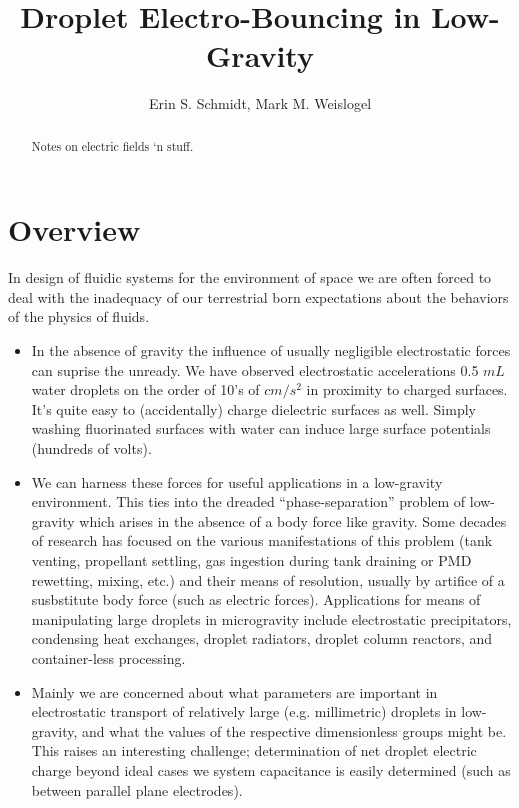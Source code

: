 \documentclass[a4paper, 12pt]{article}
\title{\textsf{\textbf{Droplet Electro-Bouncing in Low-Gravity}}}
\author{Erin S. Schmidt, Mark M. Weislogel}
\date{}
\begin{document}
\maketitle

\begin{abstract}
\noindent
Notes on electric fields `n stuff.
\end{abstract}

\section{Overview}
In design of fluidic systems for the environment of space we are often forced to deal with the inadequacy of our terrestrial born expectations about the behaviors of the physics of fluids.   

\begin{itemize}
\item In the absence of gravity the influence of usually negligible electrostatic forces can suprise the unready. We have observed electrostatic accelerations 0.5 $mL$ water droplets on the order of 10's of $cm/s^2$ in proximity to charged surfaces. It's quite easy to (accidentally) charge dielectric surfaces as well. Simply washing fluorinated surfaces with water can induce large surface potentials (hundreds of volts).

\item We can harness these forces for useful applications in a low-gravity environment. This ties into the dreaded ``phase-separation'' problem of low-gravity which arises in the absence of a body force like gravity. Some decades of research has focused on the various manifestations of this problem (tank venting, propellant settling, gas ingestion during tank draining or PMD rewetting, mixing, etc.) and their means of resolution, usually by artifice of a susbstitute body force (such as electric forces). Applications for means of manipulating large droplets in microgravity include electrostatic precipitators, condensing heat exchanges, droplet radiators, droplet column reactors, and container-less processing.

\item Mainly we are concerned about what parameters are important in electrostatic transport of relatively large (e.g. millimetric) droplets in low-gravity, and what the values of the respective dimensionless groups might be. This raises an interesting challenge; determination of net droplet electric charge beyond ideal cases we system capacitance is easily determined (such as between parallel plane electrodes).

\end{itemize}
\end{document}
